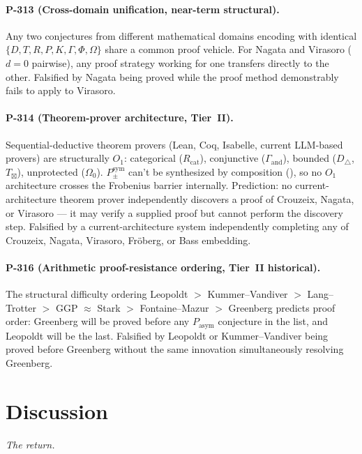 \documentclass[12pt,a4paper]{article}
\newcommand{\Ppms}{P_{\pm}^{\text{sym}}}
\begin{document}
\paragraph{P-313 (Cross-domain unification, near-term structural).}
Any two conjectures from different mathematical domains encoding with
identical $\{D, T, R, P, K, \Gamma, \Phi, \Omega\}$ share a common
proof vehicle. For Nagata and Virasoro ($d = 0$ pairwise), any proof
strategy working for one transfers directly to the other. Falsified by
Nagata being proved while the proof method demonstrably fails to apply
to Virasoro.

\paragraph{P-314 (Theorem-prover architecture, Tier~II).}
Sequential-deductive theorem provers (Lean, Coq, Isabelle,
current LLM-based provers) are structurally $O_1$: categorical
($R_\text{cat}$), conjunctive ($\Gamma_\text{and}$), bounded
($D_\triangle$, $T_\boxtimes$), unprotected ($\Omega_0$). $\Ppms$
can't be synthesized by composition (), so no
$O_1$ architecture crosses the Frobenius barrier internally.
Prediction: no current-architecture theorem prover independently
discovers a proof of Crouzeix, Nagata, or Virasoro --- it may
verify a supplied proof but cannot perform the discovery step.
Falsified by a current-architecture system independently completing
any of Crouzeix, Nagata, Virasoro, Fr{\"o}berg, or Bass embedding.

\paragraph{P-316 (Arithmetic proof-resistance ordering, Tier~II
historical).}
The structural difficulty ordering Leopoldt $>$ Kummer--Vandiver $>$
Lang--Trotter $>$ GGP $\approx$ Stark $>$ Fontaine--Mazur $>$
Greenberg predicts proof order: Greenberg will be proved before any
$P_\text{asym}$ conjecture in the list, and Leopoldt will be the
last. Falsified by Leopoldt or Kummer--Vandiver being proved before
Greenberg without the same innovation simultaneously resolving Greenberg.

\section{Discussion}
\label{sec:discussion}
\noindent\emph{The return.}\medskip
\end{document}
